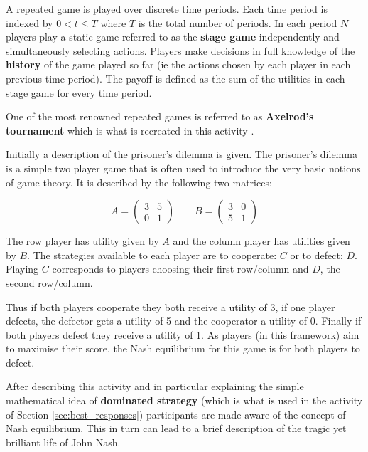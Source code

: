 \documentclass{article}
\begin{document}
A repeated game is played over discrete time periods. Each time period is
indexed by \(0<t\leq T\) where \(T\) is the total number of periods.  In each
period \(N\) players play a static game referred to as the \textbf{stage game}
independently and simultaneously selecting actions.  Players make decisions in
full knowledge of the \textbf{history} of the game played so far (ie the actions
chosen by each player in each previous time period).  The payoff is defined
as the sum of the utilities in each stage game for every time period.

One of the most renowned repeated games is referred to as \textbf{Axelrod's
tournament} which is what is recreated in this activity \cite{Axelrod1980a,
Axelrod1980b}.

Initially a description of the prisoner's dilemma \cite{Maschler2013} is given.
The prisoner's dilemma is a simple two player game that is often used to
introduce the very basic notions of game theory. It is described by the
following two matrices:

\[
    A =
    \begin{pmatrix}
        3&5\\
        0&1
    \end{pmatrix}
    \qquad
    B =
    \begin{pmatrix}
        3&0\\
        5&1
    \end{pmatrix}
\]

The row player has utility given by \(A\) and the column player has utilities
given by \(B\).
The strategies available to each player are to cooperate: \(C\) or to defect:
\(D\). Playing \(C\) corresponds to players choosing their first row/column and
\(D\), the second row/column.

Thus if both players cooperate they both receive a utility of 3, if one player
defects, the defector gets a utility of 5 and the cooperator a utility of 0.
Finally if both players defect they receive a utility of 1. As players (in this
framework) aim to maximise their score, the Nash equilibrium for this game is
for both players to defect.

After describing this activity and in particular explaining the simple
mathematical idea of \textbf{dominated strategy} (which is what is used in the
activity of Section \ref{sec:best_responses}) participants are made aware of the
concept of Nash equilibrium. This in turn can lead to a brief description of the
tragic yet brilliant life of John Nash.
\end{document}
